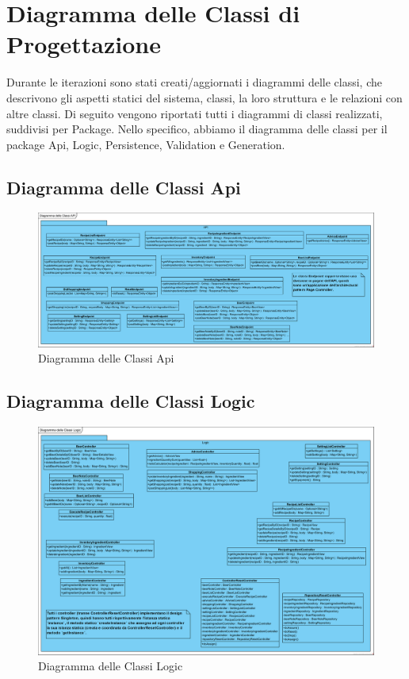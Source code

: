 \documentclass[a4paper,12pt]{report}
\begin{document}
         \section{Diagramma delle Classi di Progettazione}
Durante le iterazioni sono stati creati/aggiornati i diagrammi delle classi, che descrivono gli aspetti statici del sistema, classi, la loro struttura e le relazioni con altre classi.
Di seguito vengono riportati tutti i diagrammi di classi realizzati, suddivisi per Package. Nello specifico, abbiamo il diagramma delle classi per il package Api, Logic, Persistence, Validation e Generation.
\newpage
		\subsection{Diagramma delle Classi Api}
			\begin{figure}[!h]
				\centering
				\includegraphics[width=01\linewidth]{image/Diagramma-delle-Classi-Api.png}
				\caption{Diagramma delle Classi  Api}\label{fig:1}
			\end{figure}         

		\subsection{Diagramma delle Classi Logic}
			\begin{figure}[!h]
				\centering
				\includegraphics[width=01\linewidth]{image/Diagramma-delle-Classi-Logic.png}
				\caption{Diagramma delle Classi Logic  }\label{fig:1}
			\end{figure}           
\newpage
\end{document}
